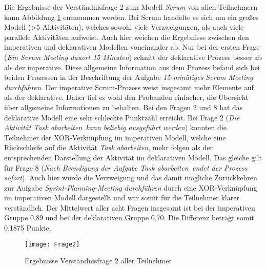 Die Ergebnisse der Verständnisfrage 2 zum Modell \textit{Scrum} von allen Teilnehmern kann Abbildung \ref{fig:Frage2} entnommen werden.  Bei Scrum handelte es sich um ein großes Modell (>5 Aktivitäten), welches sowohl viele Verzweigungen, als auch viele parallele Aktivitäten aufweist. Auch hier weichen die Ergebnisse zwischen den imperativen und deklarativen Modellen voneinander ab.\newline
Nur bei der ersten Frage (\textit{Ein Scrum Meeting dauert 15 Minuten}) schnitt der deklarative Prozess besser ab als der imperative. Diese allgemeine Information aus dem Prozess befand sich bei beiden Prozessen in der Beschriftung der Aufgabe \textit{15-minütiges Scrum Meeting durchführen}. Der imperative Scrum-Prozess weist insgesamt mehr Elemente auf als der deklarative. Daher fiel es wohl den Probanden einfacher, die Übersicht über allgemeine Informationen zu behalten.\newline
Bei den Fragen 2 und 8 hat das deklarative Modell eine sehr schlechte Punktzahl erreicht. Bei Frage 2 (\textit{Die Aktivität \grqq Task abarbeiten\grqq \ kann beliebig ausgeführt werden}) konnten die Teilnehmer der XOR-Verknüpfung im imperativen Modell, welche eine Rückschleife auf die Aktivität \textit{Task abarbeiten}, mehr folgen als der entsprechenden Darstellung der Aktivität im deklarativen Modell. \newline
Das gleiche gilt für Frage 8 (\textit{Nach Beendigung der Aufgabe \grqq Task abarbeiten\grqq \ endet der Prozess sofort}). Auch hier wurde die Verzweigung und das damit mögliche Zurückkehren zur Aufgabe \textit{Sprint-Planning-Meeting durchführen} durch eine XOR-Verknüpfung im imperativen Modell dargestellt und war somit für die Teilnehmer klarer verständlich.\newline
Der Mittelwert aller acht Fragen insgesamt ist bei der imperativen Gruppe 0,89 und bei der deklarativen Gruppe 0,70. Die Differenz beträgt somit 0,1875 Punkte.\newline


\begin{figure}[htp]
\begin{center}
  \texttt{[image: Frage2]} %
  \caption{Ergebnisse Verständnisfrage 2 aller Teilnehmer}
  \label{fig:Frage2}
\end{center}
\end{figure}

